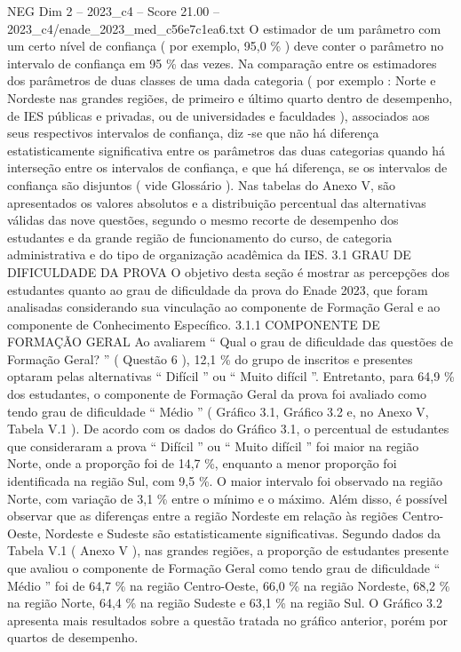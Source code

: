 \begin{textsample}{NEG Dim 2 – 2023\_c4 – Score 21.00 – 2023\_c4/enade\_2023\_med\_c56e7c1ea6.txt}
O estimador de um parâmetro com um certo nível de confiança ( por exemplo, 95,0 \% ) deve conter o parâmetro no intervalo de confiança em 95 \% das vezes.
Na comparação entre os estimadores dos parâmetros de duas classes de uma dada categoria ( por exemplo : Norte e Nordeste nas grandes regiões, de primeiro e último quarto dentro de desempenho, de IES públicas e privadas, ou de universidades e faculdades ), associados aos seus respectivos intervalos de confiança, diz -se que não há diferença estatisticamente significativa entre os parâmetros das duas categorias quando há interseção entre os intervalos de confiança, e que há diferença, se os intervalos de confiança são disjuntos ( vide Glossário ).
Nas tabelas do Anexo V, são apresentados os valores absolutos e a distribuição percentual das alternativas válidas das nove questões, segundo o mesmo recorte de desempenho dos estudantes e da grande região de funcionamento do curso, de categoria administrativa e do tipo de organização acadêmica da IES. 3.1 GRAU DE DIFICULDADE DA PROVA O objetivo desta seção é mostrar as percepções dos estudantes quanto ao grau de dificuldade da prova do Enade 2023, que foram analisadas considerando sua vinculação ao componente de Formação Geral e ao componente de Conhecimento Específico. 3.1.1 COMPONENTE DE FORMAÇÃO GERAL Ao avaliarem “ Qual o grau de dificuldade das questões de Formação Geral? ” ( Questão 6 ), 12,1 \% do grupo de inscritos e presentes optaram pelas alternativas “ Difícil ” ou “ Muito difícil ”.
Entretanto, para 64,9 \% dos estudantes, o componente de Formação Geral da prova foi avaliado como tendo grau de dificuldade “ Médio ” ( Gráfico 3.1, Gráfico 3.2 e, no Anexo V, Tabela V.1 ).
De acordo com os dados do Gráfico 3.1, o percentual de estudantes que consideraram a prova “ Difícil ” ou “ Muito difícil ” foi maior na região Norte, onde a proporção foi de 14,7 \%, enquanto a menor proporção foi identificada na região Sul, com 9,5 \%.
O maior intervalo foi observado na região Norte, com variação de 3,1 \% entre o mínimo e o máximo.
Além disso, é possível observar que as diferenças entre a região Nordeste em relação às regiões Centro-Oeste, Nordeste e Sudeste são estatisticamente significativas.
Segundo dados da Tabela V.1 ( Anexo V ), nas grandes regiões, a proporção de estudantes presente que avaliou o componente de Formação Geral como tendo grau de dificuldade “ Médio ” foi de 64,7 \% na região Centro-Oeste, 66,0 \% na região Nordeste, 68,2 \% na região Norte, 64,4 \% na região Sudeste e 63,1 \% na região Sul.
O Gráfico 3.2 apresenta mais resultados sobre a questão tratada no gráfico anterior, porém por quartos de desempenho.

\end{textsample}
